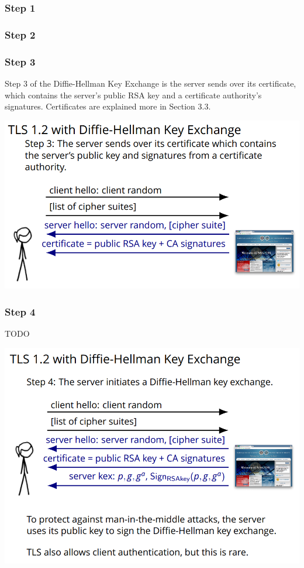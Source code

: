 \documentclass[11pt]{article} %
\begin{document}
{\subsubsection{Step 1}

\newpage
\subsubsection{Step 2}

\newpage
\subsubsection{Step 3}
Step 3 of the Diffie-Hellman Key Exchange is the server sends over its certificate, which contains the server’s public RSA key and a certificate authority's signatures. Certificates are explained more in Section 3.3.

\includegraphics[scale=1.2]{./DiffieStep3.png}


\newpage
\subsubsection{Step 4}
TODO

\includegraphics[scale=1.2]{./DiffieStep4.png}

}
\end{document}
